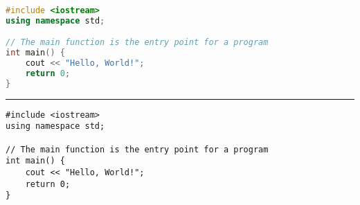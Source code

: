\documentclass{article}
\begin{document}
\begin{lstlisting}[language=C++]
#include <iostream>
using namespace std;

// The main function is the entry point for a program
int main() {
    cout << "Hello, World!";
    return 0;
}
\end{lstlisting}

\noindent\rule{\linewidth}{1pt}


\begin{lstlisting}
#include <iostream>
using namespace std;

// The main function is the entry point for a program
int main() {
    cout << "Hello, World!";
    return 0;
}
\end{lstlisting}
\end{document}
